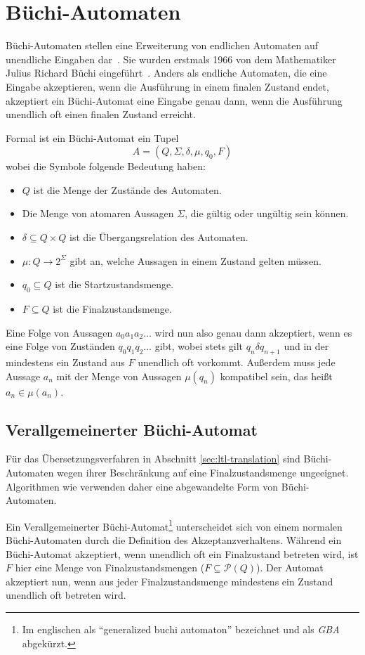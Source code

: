 \section{Büchi-Automaten}
Büchi-Automaten stellen eine Erweiterung von endlichen Automaten auf unendliche Eingaben dar~\cite{buchibasics}.
Sie wurden erstmals 1966 von dem Mathematiker Julius Richard Büchi eingeführt~\cite{buchi}.
Anders als endliche Automaten, die eine Eingabe akzeptieren, wenn die Ausführung in einem finalen Zustand endet, akzeptiert ein Büchi-Automat eine Eingabe genau dann, wenn die Ausführung unendlich oft einen finalen Zustand erreicht.

Formal ist ein Büchi-Automat ein Tupel
\[ A = (Q,\Sigma,\delta,\mu,q_0,F) \]
wobei die Symbole folgende Bedeutung haben:
\begin{itemize}
  \item $Q$ ist die Menge der Zustände des Automaten.
  \item Die Menge von atomaren Aussagen $\Sigma$, die gültig oder ungültig sein können.
  \item $\delta\subseteq Q\times Q$ ist die Übergangsrelation des Automaten.
  \item $\mu : Q\rightarrow2^\Sigma$ gibt an, welche Aussagen in einem Zustand gelten müssen.
  \item $q_0\subseteq Q$ ist die Startzustandsmenge.
  \item $F\subseteq Q$ ist die Finalzustandsmenge.
\end{itemize}
Eine Folge von Aussagen $a_0a_1a_2\dots$ wird nun also genau dann akzeptiert, wenn es eine Folge von Zuständen $q_0q_1q_2\dots$ gibt, wobei stets gilt $q_n\delta q_{n+1}$ und in der mindestens ein Zustand aus $F$ unendlich oft vorkommt.
Außerdem muss jede Aussage $a_n$ mit der Menge von Aussagen $\mu(q_n)$ kompatibel sein, das heißt $a_n\in \mu(a_n)$.

\subsection{Verallgemeinerter Büchi-Automat}
\label{sec:gba}
Für das Übersetzungsverfahren in Abschnitt \ref{sec:ltl-translation} sind Büchi-Automaten wegen ihrer Beschränkung auf eine Finalzustandsmenge ungeeignet.
Algorithmen wie \cite{Gerth95simpleon-the-fly} verwenden daher eine abgewandelte Form von Büchi-Automaten.

Ein Verallgemeinerter Büchi-Automat\footnote{Im englischen als "`generalized buchi automaton"' bezeichnet und als \emph{GBA} abgekürzt.} unterscheidet sich von einem normalen Bü\-chi-Au\-to\-ma\-ten durch die Definition des Akzeptanzverhaltens.
Während ein Büchi-Automat akzeptiert, wenn unendlich oft ein Finalzustand betreten wird, ist $F$ hier eine Menge von Finalzustandsmengen ($F\subseteq\mathcal{P}(Q)$).
Der Automat akzeptiert nun, wenn aus jeder Finalzustandsmenge mindestens ein Zustand unendlich oft betreten wird.

